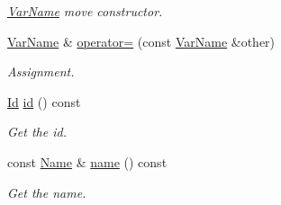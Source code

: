 \begin{DoxyCompactItemize}
\begin{DoxyCompactList}\small\item\em {\ttfamily \hyperlink{classcreek_1_1_var_name}{Var\+Name}} move constructor. \end{DoxyCompactList}\item 
\hyperlink{classcreek_1_1_var_name}{Var\+Name} \& \hyperlink{classcreek_1_1_var_name_aac34c1d97b081341d3a7123decb04a2e}{operator=} (const \hyperlink{classcreek_1_1_var_name}{Var\+Name} \&other)\hypertarget{classcreek_1_1_var_name_aac34c1d97b081341d3a7123decb04a2e}{}\label{classcreek_1_1_var_name_aac34c1d97b081341d3a7123decb04a2e}

\begin{DoxyCompactList}\small\item\em Assignment. \end{DoxyCompactList}\item 
\hyperlink{classcreek_1_1_var_name_a8dcbc9cf867fbb7e2f8202132de8690d}{Id} \hyperlink{classcreek_1_1_var_name_a0cbd3de45ec3a671ef91b99cac2ed803}{id} () const \hypertarget{classcreek_1_1_var_name_a0cbd3de45ec3a671ef91b99cac2ed803}{}\label{classcreek_1_1_var_name_a0cbd3de45ec3a671ef91b99cac2ed803}

\begin{DoxyCompactList}\small\item\em Get the id. \end{DoxyCompactList}\item 
const \hyperlink{classcreek_1_1_var_name_a9d09406258e87f40bc1fea0cbf9c86cc}{Name} \& \hyperlink{classcreek_1_1_var_name_af508e16490f2cfbfdcb561f9c855fcf0}{name} () const \hypertarget{classcreek_1_1_var_name_af508e16490f2cfbfdcb561f9c855fcf0}{}\label{classcreek_1_1_var_name_af508e16490f2cfbfdcb561f9c855fcf0}

\begin{DoxyCompactList}\small\item\em Get the name. \end{DoxyCompactList}\end{DoxyCompactItemize}
